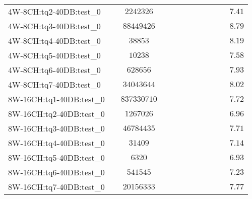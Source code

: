\begin{tabular}{|l|c|c|c|c|c|c|c|c|c|c|c|}
4W-8CH:tq2-40DB:test\_0   & $          $ & $ 2242326     $ & $       $ & $  $ & $    $ & $       $ & $  $ & $   $ & $             $ & $         $ & $ 7.41    $ \\
4W-8CH:tq3-40DB:test\_0   & $          $ & $ 88449426    $ & $       $ & $  $ & $    $ & $       $ & $  $ & $   $ & $             $ & $         $ & $ 8.79    $ \\
4W-8CH:tq4-40DB:test\_0   & $          $ & $ 38853       $ & $       $ & $  $ & $    $ & $       $ & $  $ & $   $ & $             $ & $         $ & $ 8.19    $ \\
4W-8CH:tq5-40DB:test\_0   & $          $ & $ 10238       $ & $       $ & $  $ & $    $ & $       $ & $  $ & $   $ & $             $ & $         $ & $ 7.58    $ \\
4W-8CH:tq6-40DB:test\_0   & $          $ & $ 628656      $ & $       $ & $  $ & $    $ & $       $ & $  $ & $   $ & $             $ & $         $ & $ 7.93    $ \\
4W-8CH:tq7-40DB:test\_0   & $          $ & $ 34043644    $ & $       $ & $  $ & $    $ & $       $ & $  $ & $   $ & $             $ & $         $ & $ 8.02    $ \\
8W-16CH:tq1-40DB:test\_0  & $          $ & $ 837330710   $ & $       $ & $  $ & $    $ & $       $ & $  $ & $   $ & $             $ & $         $ & $ 7.72    $ \\
8W-16CH:tq2-40DB:test\_0  & $          $ & $ 1267026     $ & $       $ & $  $ & $    $ & $       $ & $  $ & $   $ & $             $ & $         $ & $ 6.96    $ \\
8W-16CH:tq3-40DB:test\_0  & $          $ & $ 46784435    $ & $       $ & $  $ & $    $ & $       $ & $  $ & $   $ & $             $ & $         $ & $ 7.71    $ \\
8W-16CH:tq4-40DB:test\_0  & $          $ & $ 31409       $ & $       $ & $  $ & $    $ & $       $ & $  $ & $   $ & $             $ & $         $ & $ 7.14    $ \\
8W-16CH:tq5-40DB:test\_0  & $          $ & $ 6320        $ & $       $ & $  $ & $    $ & $       $ & $  $ & $   $ & $             $ & $         $ & $ 6.93    $ \\
8W-16CH:tq6-40DB:test\_0  & $          $ & $ 541545      $ & $       $ & $  $ & $    $ & $       $ & $  $ & $   $ & $             $ & $         $ & $ 7.23    $ \\
8W-16CH:tq7-40DB:test\_0  & $          $ & $ 20156333    $ & $       $ & $  $ & $    $ & $       $ & $  $ & $   $ & $             $ & $         $ & $ 7.77    $ \\

\end{tabular}
